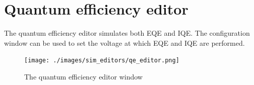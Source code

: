 \section{Quantum efficiency editor}
The quantum efficiency editor simulates both EQE and IQE.  The configuration window can be used to set the voltage at which EQE and IQE are performed.
\begin{figure}[H]
\centering
\texttt{[image: ./images/sim\_editors/qe\_editor.png]}
\caption{The quantum efficiency editor window}
\label{fig:qeeditor}
\end{figure}


